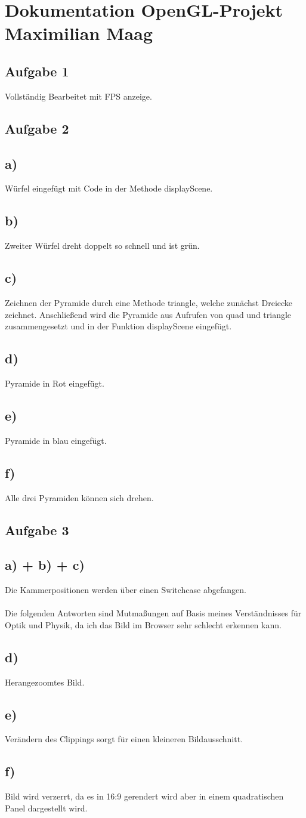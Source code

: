\documentclass{article}
\begin{document}
	\section*{Dokumentation OpenGL-Projekt Maximilian Maag}
	\subsection*{Aufgabe 1}
	Vollständig Bearbeitet mit FPS anzeige.
	\subsection*{Aufgabe 2}
	\subsection*{a)}
	Würfel eingefügt mit Code in der Methode displayScene.
	\subsection*{b)}
	Zweiter Würfel dreht doppelt so schnell und ist grün.
	\subsection*{c)}
	Zeichnen der Pyramide durch eine Methode triangle, welche zunächst Dreiecke zeichnet. Anschließend wird die Pyramide aus Aufrufen von quad und triangle zusammengesetzt und in der Funktion displayScene eingefügt.
	\subsection*{d)}
	Pyramide in Rot eingefügt.
	\subsection*{e)}
	Pyramide in blau eingefügt.
	\subsection*{f)}
	Alle drei Pyramiden können sich drehen. 
	\subsection*{Aufgabe 3}
	\subsection*{a) + b) + c)}
	Die Kammerpositionen werden über einen Switchcase abgefangen.
	\\ \\
	Die folgenden Antworten sind Mutmaßungen auf Basis meines Verständnisses für Optik und Physik, da ich das Bild im Browser sehr schlecht erkennen kann.
	\subsection*{d)}
	Herangezoomtes Bild.
	\subsection*{e)}
	Verändern des Clippings sorgt für einen kleineren Bildausschnitt.
	\subsection*{f)}
	Bild wird verzerrt, da es in 16:9 gerendert wird aber in einem quadratischen Panel dargestellt wird.
\end{document}
